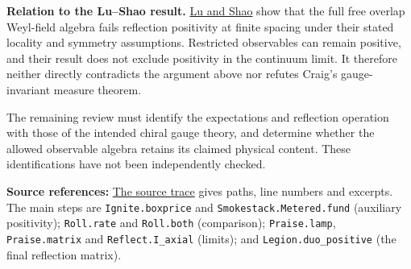 \documentclass[11pt]{article}
\begin{document}
\textbf{Relation to the Lu--Shao result.}
\href{https://arxiv.org/html/2611.20084v1#S3.SS2}{Lu and Shao}
show that the full free overlap Weyl-field algebra fails reflection positivity
at finite spacing under their stated locality and symmetry assumptions.
Restricted observables can remain positive, and their result does not exclude
positivity in the continuum limit. It therefore neither directly contradicts
the argument above nor refutes Craig's gauge-invariant measure theorem.

The remaining review must identify the expectations and reflection operation
with those of the intended chiral gauge theory, and determine whether the
allowed observable algebra retains its claimed physical content. These
identifications have not been independently checked.

{\small\textbf{Source references:}
\href{su5-reflection-positivity-trace.txt}{The source trace}
gives paths, line numbers and excerpts. The main steps are
\texttt{Ignite.boxprice} and \texttt{Smokestack.Metered.fund} (auxiliary
positivity); \texttt{Roll.rate} and \texttt{Roll.both} (comparison);
\texttt{Praise.lamp}, \texttt{Praise.matrix} and \texttt{Reflect.I\_axial}
(limits); and \texttt{Legion.duo\_positive} (the final reflection matrix).}
\end{document}
